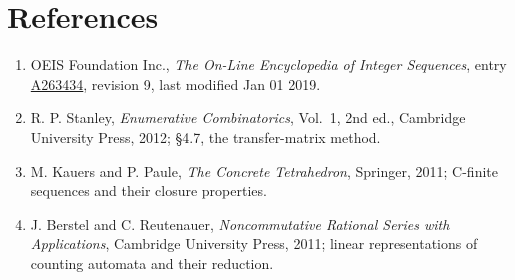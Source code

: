 \documentclass[11pt]{article}
\theoremstyle{definition}
\begin{document}
\section{References}

\begin{enumerate}

\item OEIS Foundation Inc., \emph{The On-Line Encyclopedia of Integer Sequences}, entry \href{https://oeis.org/A263434}{A263434}, revision 9, last modified Jan 01 2019.

\item R. P. Stanley, \emph{Enumerative Combinatorics}, Vol.~1, 2nd ed., Cambridge University Press, 2012; \S4.7, the transfer-matrix method.

\item M. Kauers and P. Paule, \emph{The Concrete Tetrahedron}, Springer, 2011; C-finite sequences and their closure properties.

\item J. Berstel and C. Reutenauer, \emph{Noncommutative Rational Series with Applications}, Cambridge University Press, 2011; linear representations of counting automata and their reduction.

\end{enumerate}
\end{document}
